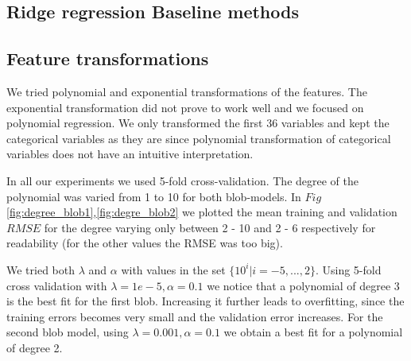 \documentclass{article} %
\begin{document}
\subsection{Ridge regression Baseline methods}
 

\subsection{Feature transformations}
We tried polynomial and exponential transformations of the features.
The exponential transformation did not prove to work well and we focused on polynomial regression.
We only transformed the first 36 variables and kept the categorical variables as they are since  polynomial transformation of categorical variables does not have an intuitive interpretation. 

In all our experiments we used 5-fold cross-validation.
The degree of the polynomial was varied from 1 to 10 for both blob-models. In $Fig$\ref{fig:degree_blob1},\ref{fig:degre_blob2} we plotted the mean training and validation $RMSE$ for the degree varying only between 2 - 10 and 2 - 6 respectively for readability (for the other values the RMSE was too big). 

We tried both $\lambda$ and $\alpha$ with values in the set $\{10^i | i =-5,...,2\}$.
Using 5-fold cross validation with $\lambda = 1e-5, \alpha = 0.1$ we
notice that a polynomial of degree 3 is the best fit for the first blob. Increasing it further leads to overfitting, since the training errors becomes very small and the validation error increases. For the second blob model, using  $\lambda = 0.001, \alpha = 0.1$ we obtain a best fit for a polynomial of degree 2.
\end{document}
